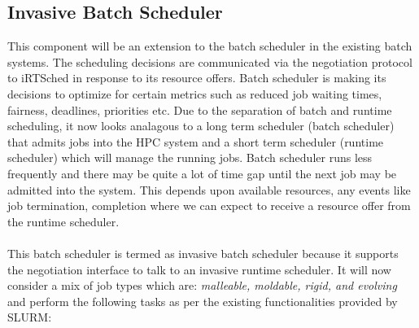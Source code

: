 \subsection{Invasive Batch Scheduler}
This component will be an extension to the batch scheduler in the existing batch systems. The scheduling decisions are communicated via the negotiation protocol to iRTSched in response to its resource offers. Batch scheduler is making its decisions to optimize for certain metrics such as reduced job waiting times, fairness, deadlines, priorities etc. Due to the separation of batch and runtime scheduling, it now looks analagous to a long term scheduler (batch scheduler) that admits jobs into the HPC system and a short term scheduler (runtime scheduler) which will manage the running jobs. Batch scheduler runs less frequently and there may be quite a lot of time gap until the next job may be admitted into the system. This depends upon available resources, any events like job termination, completion where we can expect to receive a resource offer from the runtime scheduler.\\ \\
This batch scheduler is termed as invasive batch scheduler because it supports the negotiation interface to talk to an invasive runtime scheduler. It will now consider a mix of job types which are: \textit{malleable, moldable, rigid, and evolving} and perform the following tasks as per the existing functionalities provided by SLURM:

